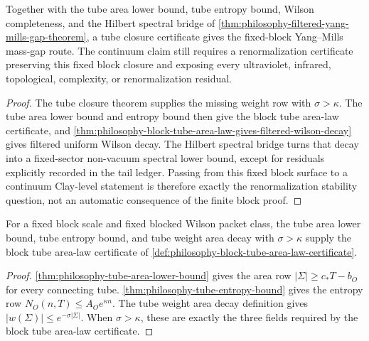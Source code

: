 \begin{corollary}
\label{cor:philosophy-tube-closure-fixed-block-gap-route}
Together with the tube area lower bound, tube entropy bound, Wilson
completeness, and the Hilbert spectral bridge of
\autoref{thm:philosophy-filtered-yang-mills-gap-theorem}, a tube closure
certificate gives the fixed-block Yang--Mills mass-gap route. The continuum
claim still requires a renormalization certificate preserving this fixed
block closure and exposing every ultraviolet, infrared, topological,
complexity, or renormalization residual.
\end{corollary}
\begin{proof}
The tube closure theorem supplies the missing weight row with
$\sigma>\kappa$. The tube area lower bound and entropy bound then give the
block tube area-law certificate, and
\autoref{thm:philosophy-block-tube-area-law-gives-filtered-wilson-decay}
gives filtered uniform Wilson decay. The Hilbert spectral bridge turns that
decay into a fixed-sector non-vacuum spectral lower bound, except for
residuals explicitly recorded in the tail ledger. Passing from this fixed
block surface to a continuum Clay-level statement is therefore exactly the
renormalization stability question, not an automatic consequence of the
finite block proof.
\end{proof}

\begin{theorem}
\label{thm:philosophy-tube-geometry-weight-give-block-area-law}
For a fixed block scale and fixed blocked Wilson packet class, the
tube area lower bound, tube entropy bound, and tube weight area decay
with $\sigma>\kappa$ supply the block tube area-law certificate of
\autoref{def:philosophy-block-tube-area-law-certificate}.
\end{theorem}
\begin{proof}
\autoref{thm:philosophy-tube-area-lower-bound} gives the area row
$|\Sigma|\ge c_{\ast}T-b_O$ for every connecting tube.
\autoref{thm:philosophy-tube-entropy-bound} gives the entropy row
$N_O(n,T)\le A_Oe^{\kappa n}$. The tube weight area decay definition
gives $|w(\Sigma)|\le e^{-\sigma|\Sigma|}$. When $\sigma>\kappa$,
these are exactly the three fields required by the block tube
area-law certificate.
\end{proof}

